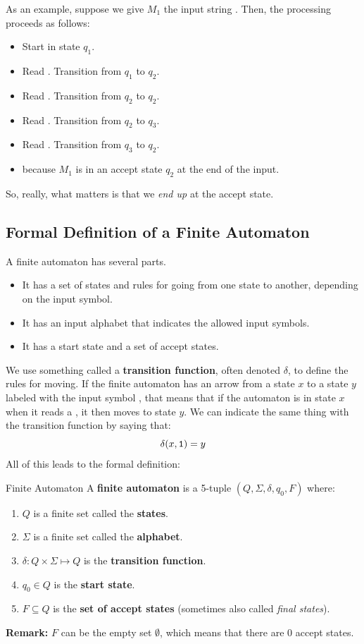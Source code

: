 \documentclass[letterpaper]{article}
\begin{document}
As an example, suppose we give $M_1$ the input string . Then, the processing proceeds as follows: 
\begin{itemize}
    \item Start in state $q_1$. 
    \item Read . Transition from $q_1$ to $q_2$. 
    \item Read . Transition from $q_2$ to $q_2$. 
    \item Read . Transition from $q_2$ to $q_3$. 
    \item Read . Transition from $q_3$ to $q_2$. 
    \item {} because $M_1$ is in an accept state $q_2$ at the end of the input. 
\end{itemize}
So, really, what matters is that we \emph{end up} at the accept state. 

\subsection{Formal Definition of a Finite Automaton}
A finite automaton has several parts.
\begin{itemize}
    \item It has a set of states and rules for going from one state to another, depending on the input symbol.
    \item It has an input alphabet that indicates the allowed input symbols. 
    \item It has a start state and a set of accept states. 
\end{itemize}
We use something called a \textbf{transition function}, often denoted $\delta$, to define the rules for moving. If the finite automaton has an arrow from a state $x$ to a state $y$ labeled with the input symbol , that means that if the automaton is in state $x$ when it reads a , it then moves to state $y$. We can indicate the same thing with the transition function by saying that: 
\[\delta(x, \texttt{1}) = y\]
All of this leads to the formal definition:
\begin{definition}{Finite Automaton}{}
    A \textbf{finite automaton} is a 5-tuple $(Q, \Sigma, \delta, q_0, F)$ where: 
    \begin{enumerate}
        \item $Q$ is a finite set called the \textbf{states}.
        \item $\Sigma$ is a finite set called the \textbf{alphabet}.
        \item $\delta: Q \times \Sigma \mapsto Q$ is the \textbf{transition function}.
        \item $q_0 \in Q$ is the \textbf{start state}.
        \item $F \subseteq Q$ is the \textbf{set of accept states} (sometimes also called \emph{final states}).
    \end{enumerate}
\end{definition}
\textbf{Remark:} $F$ can be the empty set $\emptyset$, which means that there are 0 accept states.
\end{document}
